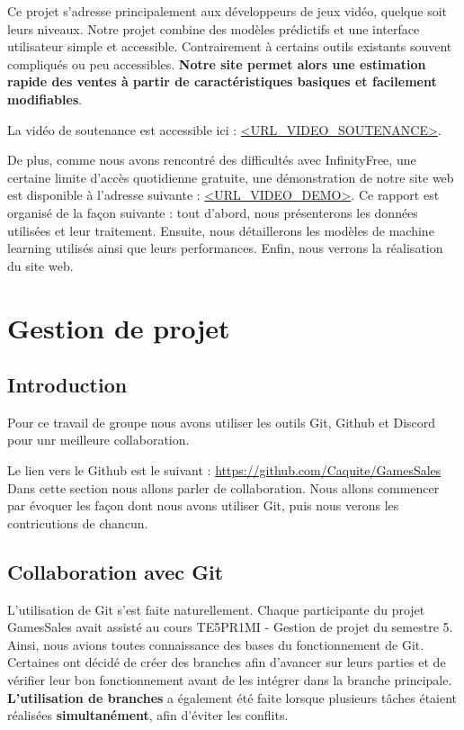 \documentclass[mstat,12pt]{unswthesis}
\begin{document}
Ce projet s’adresse principalement aux développeurs de jeux vidéo, quelque soit leurs niveaux. Notre projet combine des modèles prédictifs et une interface utilisateur
simple et accessible. Contrairement à certains outils existants souvent compliqués ou peu accessibles.
\textbf{Notre site permet alors une estimation rapide des ventes à partir de caractéristiques basiques et facilement modifiables}.

La vidéo de soutenance est accessible ici : \url{<URL\_VIDEO\_SOUTENANCE>}.

De plus, comme nous avons rencontré des difficultés avec InfinityFree, une certaine limite d’accès quotidienne gratuite, une démonstration de notre site web
est disponible à l’adresse suivante : \url{<URL\_VIDEO\_DEMO>}. Ce rapport est organisé de la façon suivante : tout d’abord, nous présenterons les
données utilisées et leur traitement. Ensuite, nous détaillerons les modèles de machine learning utilisés ainsi que leurs performances. Enfin,
nous verrons la réalisation du site web.


\hypertarget{Gestion-de-projet}{%
\chapter{Gestion de projet }\label{chapGestionProjet}}

\hypertarget{IntroductionGestionProjet}{%
\section{Introduction}\label{IntroGestionProjet}}

Pour ce travail de groupe nous avons utiliser les outils Git, Github et Discord pour
unr meilleure collaboration.

Le lien vers le Github est le suivant : \url{https://github.com/Caquite/GamesSales} \\

Dans cette section nous allons parler de collaboration. Nous allons commencer par évoquer les
façon dont nous avons utiliser Git, puis nous verons les contricutions de chancun.


\hypertarget{collaborationGit}{%
\section{Collaboration avec Git}\label{collaborationGit}}

L'utilisation de Git s'est faite naturellement. Chaque participante du projet GamesSales avait assisté au cours TE5PR1MI - Gestion de projet du semestre 5.
Ainsi, nous avions toutes connaissance des bases du fonctionnement de Git. Certaines ont décidé de créer des branches afin d’avancer sur leurs parties et de vérifier
leur bon fonctionnement avant de les intégrer dans la branche principale. \textbf{L’utilisation de branches} a également été faite lorsque plusieurs tâches étaient réalisées
 \textbf{simultanément}, afin d’éviter les conflits.
\end{document}
